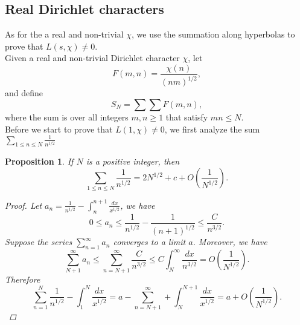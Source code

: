 \documentclass[psamsfonts]{amsart}
\newtheorem{prop}[thm]{Proposition}
\theoremstyle{definition}
\theoremstyle{remark}
\numberwithin{equation}{section}
\begin{document}
		\subsection{Real Dirichlet characters}
			As for the a real and non-trivial $\chi$, we use the summation along hyperbolas to prove that $L(s,\chi) \neq 0$.\\
			Given a real and non-trivial Dirichlet character $\chi$, let
			\begin{equation}
				F(m,n) = \frac{\chi(n)}{(nm)^{1/2}},
			\end{equation}
			and define
			\begin{equation}
				S_N = \sum\sum F(m,n),
			\end{equation}
			where the sum is over all integers $m,n \geq 1$ that satisfy $mn \leq N$.\\
			Before we start to prove that $L(1,\chi) \neq 0$, we first analyze the sum $\sum_{1 \leq n \leq N} \frac{1}{n^{1/2}}$
			\begin{prop}
				If $N$ is a positive integer, then
				\begin{equation}
					\sum_{1 \leq n \leq N} \frac{1}{n^{1/2}} = 2N^{1/2}+c+O\left({\frac{1}{N^{1/2}}}\right).
				\end{equation}
				\begin{proof}
					Let $a_n = \frac{1}{n^{1/2}} - \int_{n}^{n+1} \frac{dx}{x^{1/2}}$, we have
					\begin{equation}
						0 \leq a_n \leq \frac{1}{n^{1/2}}-\frac{1}{(n+1)^{1/2}} \leq \frac{C}{n^{3/2}}.
					\end{equation}
					Suppose the series $\sum_{n=1}^{\infty}a_n$ converges to a limit $a$. Moreover, we have
					\begin{equation}
						\sum_{N+1}^{\infty} a_n \leq \sum_{n=N+1}^{\infty} \frac{C}{n^{3/2}} \leq C\int_{N}^{\infty} \frac{dx}{n^{3/2}} = O(\frac{1}{N^{1/2}}).
					\end{equation}							
					Therefore
					\begin{equation}
						\sum_{n=1}^{N}\frac{1}{n^{1/2}}-\int_{1}^{N}\frac{dx}{x^{1/2}} = a - \sum_{n=N+1}^{\infty}+\int_{N}^{N+1}\frac{dx}{x^{1/2}} = a + O(\frac{1}{N^{1/2}}).
					\end{equation}
				\end{proof}
			\end{prop}			
			
\end{document}
